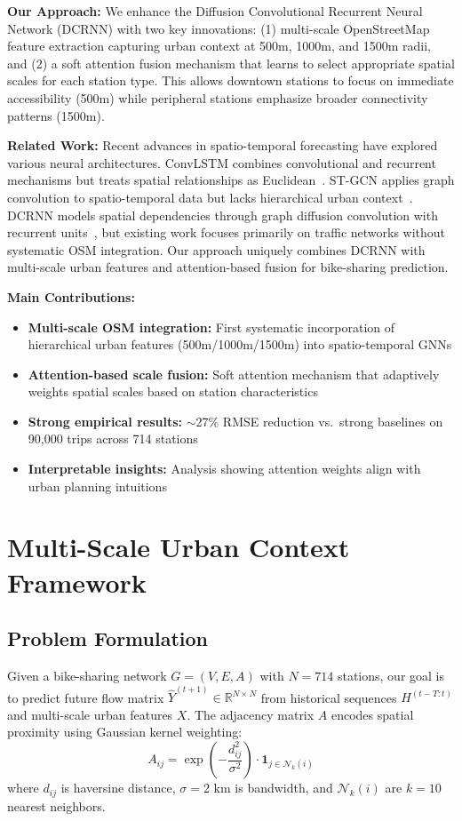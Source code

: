 \documentclass{article}
\begin{document}
\textbf{Our Approach:} We enhance the Diffusion Convolutional Recurrent Neural Network (DCRNN) with two key innovations: (1) multi-scale OpenStreetMap feature extraction capturing urban context at 500m, 1000m, and 1500m radii, and (2) a soft attention fusion mechanism that learns to select appropriate spatial scales for each station type. This allows downtown stations to focus on immediate accessibility (500m) while peripheral stations emphasize broader connectivity patterns (1500m).

\textbf{Related Work:} Recent advances in spatio-temporal forecasting have explored various neural architectures. ConvLSTM combines convolutional and recurrent mechanisms but treats spatial relationships as Euclidean~\cite{xingjian2015}. ST-GCN applies graph convolution to spatio-temporal data but lacks hierarchical urban context~\cite{yu2018}. DCRNN models spatial dependencies through graph diffusion convolution with recurrent units~\cite{li2018}, but existing work focuses primarily on traffic networks without systematic OSM integration. Our approach uniquely combines DCRNN with multi-scale urban features and attention-based fusion for bike-sharing prediction.

\textbf{Main Contributions:}
\begin{itemize}
\item \textbf{Multi-scale OSM integration:} First systematic incorporation of hierarchical urban features (500m/1000m/1500m) into spatio-temporal GNNs
\item \textbf{Attention-based scale fusion:} Soft attention mechanism that adaptively weights spatial scales based on station characteristics  
\item \textbf{Strong empirical results:} $\sim$27\% RMSE reduction vs.\ strong baselines on 90,000 trips across 714 stations
\item \textbf{Interpretable insights:} Analysis showing attention weights align with urban planning intuitions
\end{itemize}

\section{Multi-Scale Urban Context Framework}

\subsection{Problem Formulation}
Given a bike-sharing network $G = (V, E, A)$ with $N=714$ stations, our goal is to predict future flow matrix $\hat{Y}^{(t+1)} \in \mathbb{R}^{N \times N}$ from historical sequences $H^{(t-T:t)}$ and multi-scale urban features $X$. The adjacency matrix $A$ encodes spatial proximity using Gaussian kernel weighting:
\begin{equation}
A_{ij} = \exp\left(-\frac{d_{ij}^2}{\sigma^2}\right) \cdot \mathbf{1}_{j \in \mathcal{N}_k(i)}
\end{equation}
where $d_{ij}$ is haversine distance, $\sigma=2$ km is bandwidth, and $\mathcal{N}_k(i)$ are $k=10$ nearest neighbors.
\end{document}
